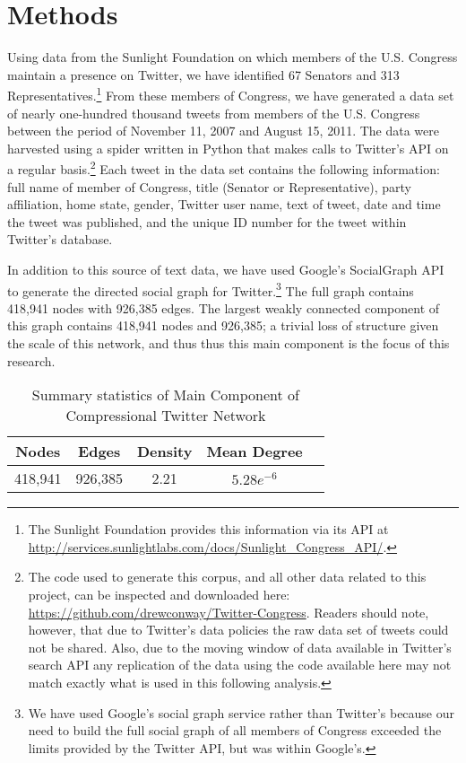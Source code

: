 \documentclass[10pt]{article}
\begin{document}
\section{Methods}
Using data from the Sunlight Foundation on which members of the U.S. Congress maintain a presence on Twitter, we have identified 67 Senators and 313 Representatives.\footnote{The Sunlight Foundation provides this information via its API at \url{http://services.sunlightlabs.com/docs/Sunlight_Congress_API/}.} From these members of Congress, we have generated a data set of nearly one-hundred thousand tweets from members of the U.S. Congress between the period of November 11, 2007 and August 15, 2011.  The data were harvested using a spider written in Python that makes calls to Twitter's API on a regular basis.\footnote{The code used to generate this corpus, and all other data related to this project, can be inspected and downloaded here: \url{https://github.com/drewconway/Twitter-Congress}.  Readers should note, however, that due to Twitter's data policies the raw data set of tweets could not be shared.  Also, due to the moving window of data available in Twitter's search API any replication of the data using the code available here may not match exactly what is used in this following analysis.}  Each tweet in the data set contains the following information: full name of member of Congress, title (Senator or Representative), party affiliation, home state, gender, Twitter user name, text of tweet, date and time the tweet was published, and the unique ID number for the tweet within Twitter's database.

In addition to this source of text data, we have used Google's SocialGraph API to generate the directed social graph for Twitter.\footnote{We have used Google's social graph service rather than Twitter's because our need to build the full social graph of all members of Congress exceeded the limits provided by the Twitter API, but was within Google's.} The full graph contains 418,941 nodes with 926,385 edges.  The largest weakly connected component of this graph contains 418,941 nodes and 926,385; a trivial loss of structure given the scale of this network, and thus thus this main component is the focus of this research.  

\begin{table}[htdp]
    \centering
    \caption{Summary statistics of Main Component of Compressional Twitter Network}
    \begin{tabular}{|c|c|c|c|c|}
        \hline
        Nodes & Edges & Density & Mean Degree \\ \hline
        418,941 & 926,385 & 2.21 & $5.28e^{-6}$ \\ \hline
    \end{tabular}
\end{table}
\end{document}
